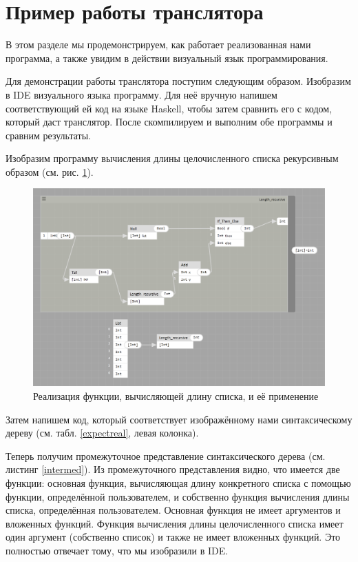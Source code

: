 \section{Пример работы транслятора}
В этом разделе мы продемонстрируем, как работает реализованная нами программа, а также увидим в действии визуальный язык программирования.

Для демонстрации работы транслятора поступим следующим образом. Изобразим в IDE визуального языка программу. Для неё вручную напишем соответствующий ей код на языке Haskell, чтобы затем сравнить его с кодом, который даст транслятор. После скомпилируем и выполним обе программы и сравним результаты.

Изобразим программу вычисления длины целочисленного списка рекурсивным образом (см. рис. \ref{lengthrec}). 
\begin{figure}[p]
	\centering
	\includegraphics[width=\textwidth]{img/length.PNG}
	\caption{Реализация функции, вычисляющей длину списка, и её применение} \label{lengthrec}	
\end{figure}
Затем напишем код, который соответствует изображённому нами синтаксическому дереву (см. табл. \ref{expectreal}, левая колонка). 

Теперь получим промежуточное представление синтаксического дерева (см. листинг \ref{intermed}). Из промежуточного представления видно, что имеется две функции: основная функция, вычисляющая длину конкретного списка с помощью функции, определённой пользователем, и собственно функция вычисления длины списка, определённая пользователем. Основная функция не имеет аргументов и вложенных функций. Функция вычисления длины целочисленного списка имеет один аргумент (собственно список) и также не имеет вложенных функций. Это полностью отвечает тому, что мы изобразили в IDE.

